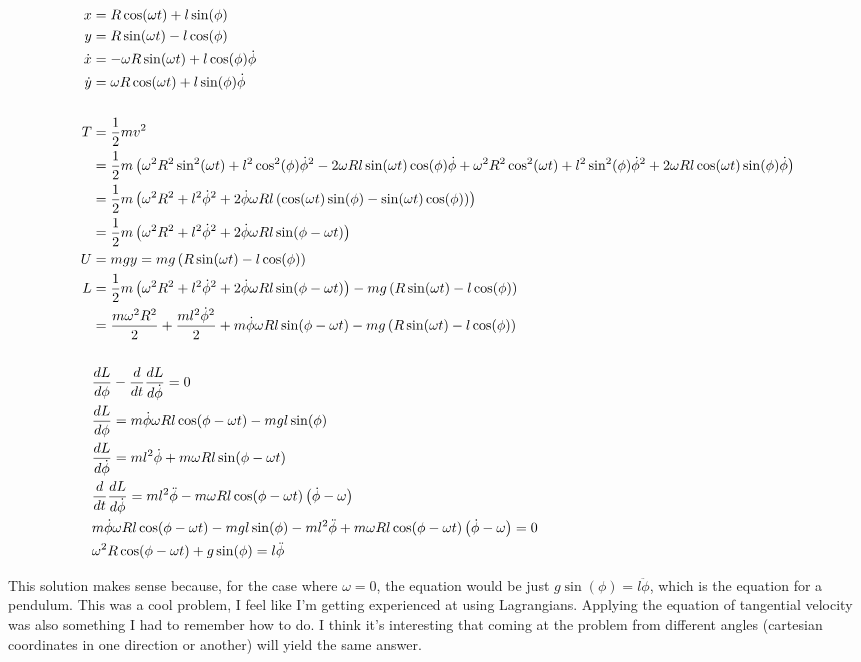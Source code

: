 \documentclass[10pt]{article} %
\begin{document}
\begin{align*}
  x &= R\cos(\omega t) + l\sin(\phi)\\
  y &= R\sin(\omega t) - l\cos(\phi)\\
  \dot{x} &= -\omega R\sin(\omega t) + l\cos(\phi)\dot{\phi}\\
  \dot{y} &= \omega R\cos(\omega t) + l\sin(\phi)\dot{\phi}\\
  \vspace{1cm}\\
  T &= \frac{1}{2}mv^2\\
  &= \frac{1}{2}m\left(\omega^2R^2\sin^2(\omega t) + l^2\cos^2(\phi)\dot{\phi}^2 - 2\omega Rl\sin(\omega t)\cos(\phi)\dot{\phi} + \omega^2 R^2\cos^2(\omega t) + l^2\sin^2(\phi)\dot{\phi}^2 + 2\omega Rl\cos(\omega t)\sin(\phi)\dot{\phi}\right)\\
  &= \frac{1}{2}m\left(\omega^2R^2 + l^2\dot{\phi}^2 + 2\dot{\phi}\omega Rl\left(\cos(\omega t)\sin(\phi) - \sin(\omega t)\cos(\phi)\right)\right)\\
  &= \frac{1}{2}m\left(\omega^2R^2 + l^2\dot{\phi}^2 + 2\dot{\phi}\omega Rl\sin(\phi - \omega t)\right)\\
  U &= mgy = mg\left(R\sin(\omega t) - l\cos(\phi)\right)\\
  L &= \frac{1}{2}m\left(\omega^2R^2 + l^2\dot{\phi}^2 + 2\dot{\phi}\omega Rl\sin(\phi - \omega t)\right) - mg\left(R\sin(\omega t) - l\cos(\phi)\right)\\
  &= \frac{m\omega^2R^2}{2} + \frac{ml^2\dot{\phi}^2}{2} + m\dot{\phi}\omega Rl\sin(\phi - \omega t) - mg\left(R\sin(\omega t) - l\cos(\phi)\right)\\
  \vspace{1cm}\\
  &\frac{dL}{d\phi} - \frac{d}{dt}\frac{dL}{d\dot{\phi}} = 0\\
  &\frac{dL}{d\phi} = m\dot{\phi}\omega Rl\cos(\phi - \omega t) - mgl\sin(\phi)\\
  &\frac{dL}{d\dot{\phi}} = ml^2\dot{\phi} + m\omega Rl\sin(\phi - \omega t)\\
  &\frac{d}{dt}\frac{dL}{d\dot{\phi}} = ml^2\ddot{\phi} - m\omega Rl\cos(\phi - \omega t)\left(\dot{\phi} - \omega\right)\\
  &m\dot{\phi}\omega Rl\cos(\phi - \omega t) - mgl\sin(\phi) - ml^2\ddot{\phi} + m\omega Rl\cos(\phi - \omega t)\left(\dot{\phi} - \omega\right) = 0\\
  &\omega^2R\cos(\phi - \omega t) + g\sin(\phi) = l\ddot{\phi}\\
\end{align*}

This solution makes sense because, for the case where $\omega = 0$, the equation would be just $g\sin(\phi) = l\ddot{\phi}$, which is the equation for a pendulum. This was a cool problem, I feel like I'm getting experienced at using Lagrangians. Applying the equation of tangential velocity was also something I had to remember how to do. I think it's interesting that coming at the problem from different angles (cartesian coordinates in one direction or another) will yield the same answer.\\
\end{document}
